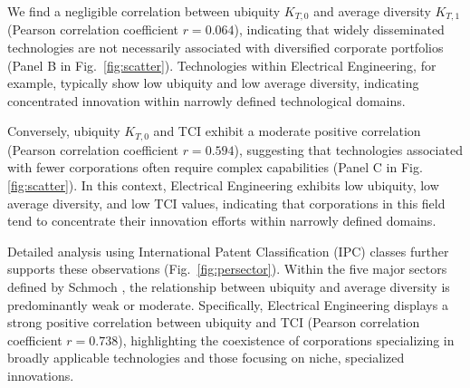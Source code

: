 We find a negligible correlation between ubiquity $K_{T,0}$ and average diversity $K_{T,1}$ (Pearson correlation coefficient $r=0.064$), indicating that widely disseminated technologies are not necessarily associated with diversified corporate portfolios (Panel B in Fig.~\ref{fig:scatter}). Technologies within Electrical Engineering, for example, typically show low ubiquity and low average diversity, indicating concentrated innovation within narrowly defined technological domains.

Conversely, ubiquity $K_{T,0}$ and TCI exhibit a moderate positive correlation (Pearson correlation coefficient $r=0.594$), suggesting that technologies associated with fewer corporations often require complex capabilities (Panel C in Fig.\ref{fig:scatter}). 
In this context, Electrical Engineering exhibits low ubiquity, low average diversity, and low TCI values, indicating that corporations in this field tend to concentrate their innovation efforts within narrowly defined domains.

Detailed analysis using International Patent Classification (IPC) classes further supports these observations (Fig.~\ref{fig:persector}). 
Within the five major sectors defined by Schmoch \cite{Schmoch2008}, the relationship between ubiquity and average diversity is predominantly weak or moderate. Specifically, Electrical Engineering displays a strong positive correlation between ubiquity and TCI (Pearson correlation coefficient $r=0.738$), highlighting the coexistence of corporations specializing in broadly applicable technologies and those focusing on niche, specialized innovations.

